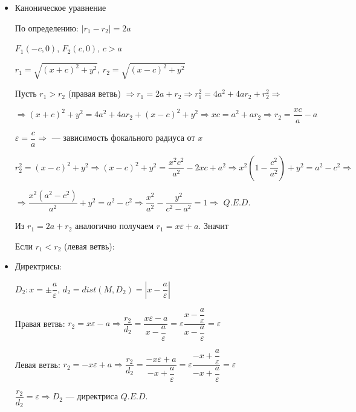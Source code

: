 \documentclass[twoside]{book}
\begin{document}
\begin{itemize}
    \item Каноническое уравнение

          По определению: \(|r_1 - r_2| = 2a\)

          \(F_1(-c, 0)\), \(F_2(c, 0)\), \(c > a\)

          \(r_1 = \sqrt{(x + c)^2 + y^2}\), \(r_2 = \sqrt{(x - c)^2 + y^2}\)

          Пусть \(r_1 > r_2\) (правая ветвь) \(\Rightarrow r_1 = 2a + r_2 \Rightarrow r_1^2 = 4a^2 + 4ar_2 + r_2^2 \Rightarrow\)

          \(\Rightarrow (x + c)^2 + y^2 = 4a^2 + 4ar_2 + (x - c)^2 + y^2 \Rightarrow xc = a^2 + ar_2 \Rightarrow r_2 = \dfrac{xc}{a} - a\)

          \(\varepsilon = \dfrac{c}{a} \Rightarrow\)  --- зависимость фокального радиуса от \(x\)

          \(r_2^2 = (x - c)^2 + y^2 \Rightarrow (x - c)^2 + y^2 = \dfrac{x^2 c^2}{a^2} - 2xc + a^2 \Rightarrow x^2\left(1 - \dfrac{c^2}{a^2}\right) + y^2 = a^2 - c^2 \Rightarrow\)

          \(\Rightarrow \dfrac{x^2(a^2 - c^2)}{a^2} + y^2 = a^2 - c^2 \Rightarrow \dfrac{x^2}{a^2} - \dfrac{y^2}{c^2 - a^2} = 1 \Rightarrow\)  \(Q.E.D.\)

          Из \(r_1 = 2a + r_2\) аналогично получаем \(r_1 = x \varepsilon + a\). Значит 

          Если \(r_1 < r_2\) (левая ветвь): 

    \item Директрисы:

          \(D_2: x = \pm \dfrac{a}{\varepsilon}\), \(d_2 = dist(M, D_2) = \left|x - \dfrac{a}{\varepsilon}\right|\)

          Правая ветвь: \(r_2 = x \varepsilon - a \Rightarrow \dfrac{r_2}{d_2} = \dfrac{x \varepsilon - a}{x - \dfrac{a}{\varepsilon}} = \varepsilon \dfrac{x - \dfrac{a}{\varepsilon}}{x - \dfrac{a}{\varepsilon}} = \varepsilon\)

          Левая ветвь: \(r_2 = -x \varepsilon + a \Rightarrow \dfrac{r_2}{d_2} = \dfrac{-x \varepsilon + a}{-x + \dfrac{a}{\varepsilon}} = \varepsilon \dfrac{-x + \dfrac{a}{\varepsilon}}{-x + \dfrac{a}{\varepsilon}} = \varepsilon\)

          \(\dfrac{r_2}{d_2} = \varepsilon \Rightarrow D_2\) --- директриса \(Q.E.D.\)


\end{itemize}
\end{document}
